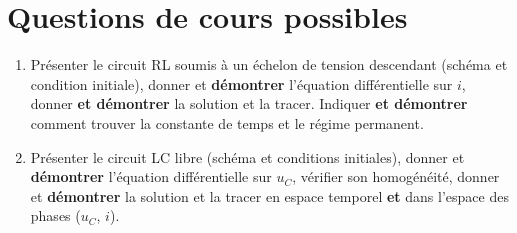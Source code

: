 \documentclass[a4paper, 12pt, final, garamond]{book}
\begin{document}
\section{Questions de cours possibles}
\begin{enumerate}
    \item Présenter le circuit RL soumis à un échelon de tension descendant
        (schéma et condition initiale), donner et \textbf{démontrer} l'équation
        différentielle sur $i$, donner \textbf{et démontrer} la solution et la
        tracer. Indiquer \textbf{et démontrer} comment trouver la constante de temps
        et le régime permanent.


    \item Présenter le circuit LC libre (schéma et conditions initiales), donner
        et \textbf{démontrer} l'équation différentielle sur $u_C$, vérifier son
        homogénéité, donner et \textbf{démontrer} la solution et la tracer en
        espace temporel \textbf{et} dans l'espace des phases ($u_C$, $i$).


\end{enumerate}
\end{document}
